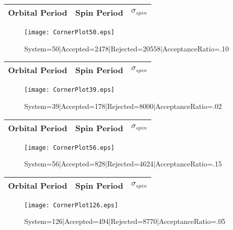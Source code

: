 \documentclass[10pt]{article}
\begin{document}
\begin{center}
        \begin{tabular}{|c|c|c|}
        \hline
Orbital Period & Spin Period & $\sigma_{spin}$ \\
 \hline
        \end{tabular}
        \end{center}
\begin{figure}[h] 
        \texttt{[image: CornerPlot50.eps]}
        \caption{System=50|Accepted=2478|Rejected=20558|AcceptanceRatio=.10}
        \label{S50}
        \centering
        \end{figure}
\begin{center}
        \begin{tabular}{|c|c|c|}
        \hline
Orbital Period & Spin Period & $\sigma_{spin}$ \\
 \hline
        \end{tabular}
        \end{center}
\begin{figure}[h] 
        \texttt{[image: CornerPlot39.eps]}
        \caption{System=39|Accepted=178|Rejected=8000|AcceptanceRatio=.02}
        \label{S39}
        \centering
        \end{figure}
\begin{center}
        \begin{tabular}{|c|c|c|}
        \hline
Orbital Period & Spin Period & $\sigma_{spin}$ \\
 \hline
        \end{tabular}
        \end{center}
\begin{figure}[h] 
        \texttt{[image: CornerPlot56.eps]}
        \caption{System=56|Accepted=828|Rejected=4624|AcceptanceRatio=.15}
        \label{S56}
        \centering
        \end{figure}
\begin{center}
        \begin{tabular}{|c|c|c|}
        \hline
Orbital Period & Spin Period & $\sigma_{spin}$ \\
 \hline
        \end{tabular}
        \end{center}
\begin{figure}[h] 
        \texttt{[image: CornerPlot126.eps]}
        \caption{System=126|Accepted=494|Rejected=8770|AcceptanceRatio=.05}
        \label{S126}
        \centering
        \end{figure}
\end{document}
